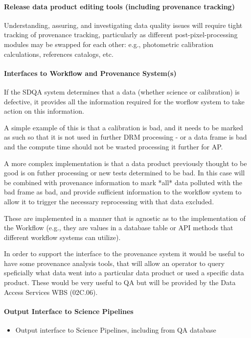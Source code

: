 \paragraph{Release data product editing tools (including provenance tracking)}
\label{sec:qaDrpProvenance}
Understanding, assuring, and investigating data quality issues will require tight tracking of provenance tracking, particularly as different post-pixel-processing modules may be swapped for each other: e.g., photometric calibration calculations, references catalogs, etc.


\paragraph{Interfaces to Workflow and Provenance System(s)}
\label{sec:qaOutputInterfaceWorkflowSystem}

If the SDQA system determines that a data (whether science or calibration) is defective, it provides all the information required for the worflow system to take action on this information.

A simple example of this is that a calibration is bad, and it needs to be marked as such so that it is not used in further DRM processing - or a data frame is bad and the compute time should not be wasted processing it further for AP.

A more complex implementation is that a data product previously thought to be good is on futher processing or new tests determined to be bad. In this case will be combined with provenance information to mark *all* data polluted with the bad frame as bad, and provide sufficient information to the workflow system to allow it to trigger the necessary reprocessing with that data excluded.

These are implemented in a manner that is agnostic as to the implementation of the Workflow (e.g., they are values in a database table or API methods that different workflow systems can utilize).

In order to support the interface to the provenance system it would be useful to have some provenance analysis tools, that will allow an operator to query speficially what data went into a particular data product or used a specific data product. These would be very useful to QA but will be provided by the Data Access Services WBS (02C.06).


\paragraph{Output Interface to Science Pipelines}
\label{sec:qaOutputInterfaceSciencePipelines}
\begin{itemize}
\item Output interface to Science Pipelines, including from QA database
\end{itemize}

